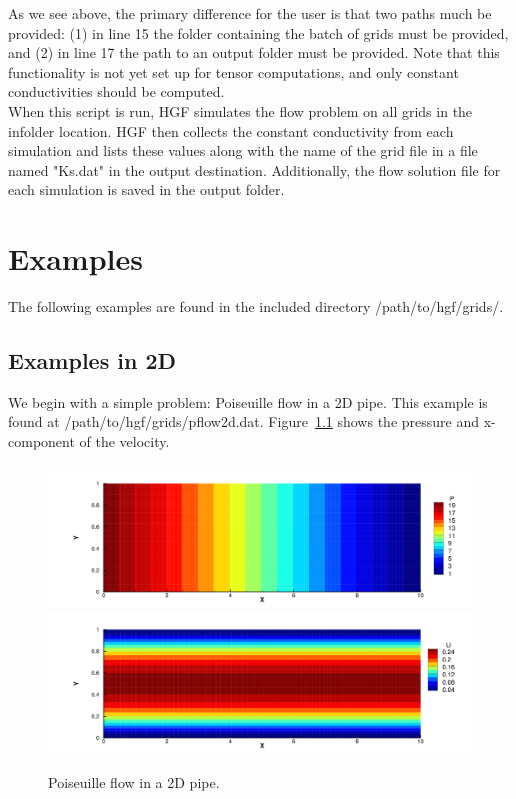 \documentclass{report}
\begin{document}
\noindent As we see above, the primary difference for the user is that
two paths much be provided: (1) in line 15 the folder containing
the batch of grids must be provided, and (2) in line 17 the
path to an output folder must be provided. Note that this functionality
is not yet set up for tensor computations, and only constant conductivities
should be computed.\\

\noindent When this script is run, HGF simulates the flow problem
on all grids in the infolder location. HGF then collects the
constant conductivity from each simulation and lists these values along
with the name of the grid file in a file named "Ks.dat" in the output
destination. Additionally, the flow solution file for each simulation is
saved in the output folder.

\chapter{Examples}

\noindent The following examples are found in the included directory /path/to/hgf/grids/.\\

\section{Examples in 2D}

\noindent We begin with a simple problem: Poiseuille flow in a 2D pipe. This
example is found at /path/to/hgf/grids/pflow2d.dat. Figure~\ref{fig:2dpflow}
shows the pressure and x-component of the velocity.\\
\begin{figure}
  \centering
  \includegraphics[width=.9\textwidth]{images/pflow2dP.png}\\
  \includegraphics[width=.9\textwidth]{images/pflow2dU.png}
  \caption{\label{fig:2dpflow}Poiseuille flow in a 2D pipe.}
\end{figure}
\end{document}
